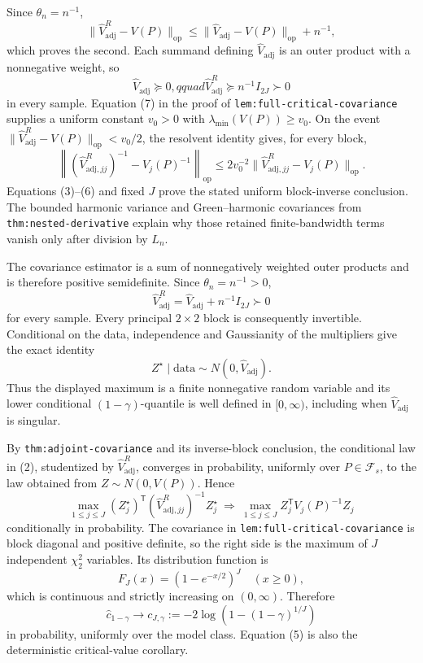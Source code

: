 Since \(\theta_n=n^{-1}\),
\[
 \|\widehat V_{\mathrm{adj}}^R-V(P)\|_{\mathrm{op}}
 \leq\|\widehat V_{\mathrm{adj}}-V(P)\|_{\mathrm{op}}+n^{-1},        \tag{4}
\]
which proves the second.  Each summand defining \(\widehat V_{\mathrm{adj}}\) is an outer product with a nonnegative weight, so
\[
 \widehat V_{\mathrm{adj}}\succeq0,qquad
 \widehat V_{\mathrm{adj}}^R\succeq n^{-1}I_{2J}\succ0               \tag{5}
\]
in every sample.  Equation (7) in the proof of \texttt{lem:full-critical-covariance} supplies a uniform constant \(v_0>0\) with \(\lambda_{\min}(V(P))\geq v_0\).  On the event
\(\|\widehat V_{\mathrm{adj}}^R-V(P)\|_{\mathrm{op}}<v_0/2\), the resolvent identity gives, for every block,
\[
 \left\|(\widehat V_{\mathrm{adj},jj}^R)^{-1}-V_j(P)^{-1}\right\|_{\mathrm{op}}
 \leq 2v_0^{-2}
 \|\widehat V_{\mathrm{adj},jj}^R-V_j(P)\|_{\mathrm{op}}.             \tag{6}
\]
Equations (3)--(6) and fixed \(J\) prove the stated uniform block-inverse conclusion.  The bounded harmonic variance and Green--harmonic covariances from \texttt{thm:nested-derivative} explain why those retained finite-bandwidth terms vanish only after division by \(L_n\).

The covariance estimator is a sum of nonnegatively weighted outer products and is therefore positive semidefinite.  Since \(\theta_n=n^{-1}>0\),
\[
 \widehat V_{\mathrm{adj}}^R
 =\widehat V_{\mathrm{adj}}+n^{-1}I_{2J}\succ0                         \tag{1}
\]
for every sample.  Every principal \(2\times2\) block is consequently invertible.  Conditional on the data, independence and Gaussianity of the multipliers give the exact identity
\[
 Z^\star\mid\text{data}\sim N(0,\widehat V_{\mathrm{adj}}).          \tag{2}
\]
Thus the displayed maximum is a finite nonnegative random variable and its lower conditional \((1-\gamma)\)-quantile is well defined in \([0,\infty)\), including when \(\widehat V_{\mathrm{adj}}\) is singular.

By \texttt{thm:adjoint-covariance} and its inverse-block conclusion, the conditional law in (2), studentized by \(\widehat V_{\mathrm{adj}}^R\), converges in probability, uniformly over \(P\in\mathcal F_s\), to the law obtained from \(Z\sim N(0,V(P))\).  Hence
\[
 \max_{1\leq j\leq J}(Z_j^\star)^{\mathsf T}
 (\widehat V_{\mathrm{adj},jj}^R)^{-1}Z_j^\star
 \ \Longrightarrow\ 
 \max_{1\leq j\leq J}Z_j^{\mathsf T}V_j(P)^{-1}Z_j                 \tag{3}
\]
conditionally in probability.  The covariance in \texttt{lem:full-critical-covariance} is block diagonal and positive definite, so the right side is the maximum of \(J\) independent \(\chi^2_2\) variables.  Its distribution function is
\[
 F_J(x)=(1-e^{-x/2})^J\quad(x\geq0),                                  \tag{4}
\]
which is continuous and strictly increasing on \((0,\infty)\).  Therefore
\[
 \widehat c_{1-\gamma}\longrightarrow
 c_{J,\gamma}:=-2\log\!\left(1-(1-\gamma)^{1/J}\right)              \tag{5}
\]
in probability, uniformly over the model class.  Equation (5) is also the deterministic critical-value corollary.


